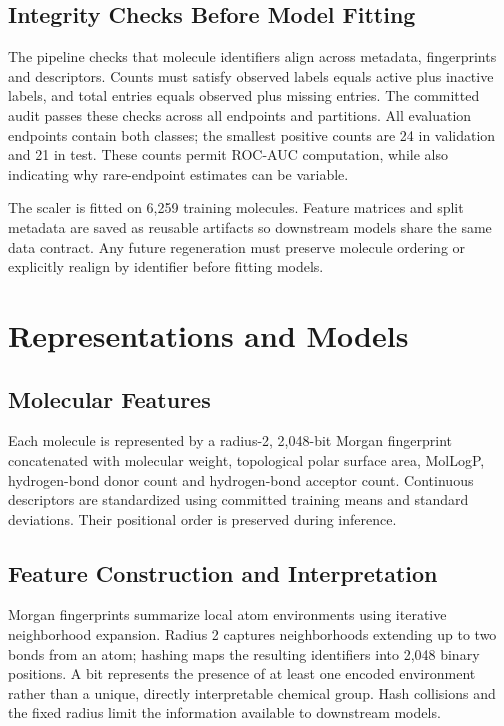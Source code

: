 \documentclass[11pt,a4paper]{article}\usepackage[margin=25mm]{geometry}\usepackage{fancyhdr}\usepackage{setspace}\usepackage{titlesec}\usepackage{xcolor}
\begin{document}
\subsection{Integrity Checks Before Model Fitting}
The pipeline checks that molecule identifiers align across metadata, fingerprints and descriptors. Counts must satisfy observed labels equals active plus inactive labels, and total entries equals observed plus missing entries. The committed audit passes these checks across all endpoints and partitions. All evaluation endpoints contain both classes; the smallest positive counts are 24 in validation and 21 in test. These counts permit ROC-AUC computation, while also indicating why rare-endpoint estimates can be variable.

The scaler is fitted on 6,259 training molecules. Feature matrices and split metadata are saved as reusable artifacts so downstream models share the same data contract. Any future regeneration must preserve molecule ordering or explicitly realign by identifier before fitting models.


\section{Representations and Models}
\subsection{Molecular Features}
Each molecule is represented by a radius-2, 2,048-bit Morgan fingerprint concatenated with molecular weight, topological polar surface area, MolLogP, hydrogen-bond donor count and hydrogen-bond acceptor count. Continuous descriptors are standardized using committed training means and standard deviations. Their positional order is preserved during inference.


\subsection{Feature Construction and Interpretation}
Morgan fingerprints summarize local atom environments using iterative neighborhood expansion. Radius 2 captures neighborhoods extending up to two bonds from an atom; hashing maps the resulting identifiers into 2,048 binary positions. A bit represents the presence of at least one encoded environment rather than a unique, directly interpretable chemical group. Hash collisions and the fixed radius limit the information available to downstream models.
\end{document}
